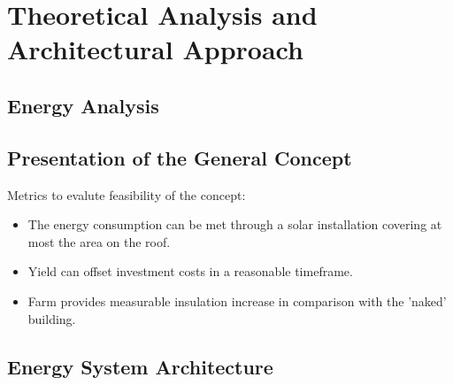 \chapter{Theoretical Analysis and Architectural Approach}
\label{chap:analysis-and-arch}
%
\section{Energy Analysis}
\label{sec:energy-analysis}
\section{Presentation of the General Concept}
Metrics to evalute feasibility of the concept:
\begin{itemize}
	\item The energy consumption can be met through a solar installation covering at most the area on the roof.
	\item Yield can offset investment costs in a reasonable timeframe.
	\item Farm provides measurable insulation increase in comparison with the 'naked' building.
\end{itemize}

\section{Energy System Architecture}
